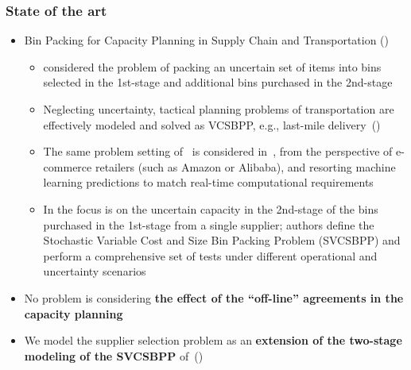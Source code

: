 \documentclass[,9pt,xcolor={dvipsnames}]{beamer} %
\begin{document}
\begin{frame}%
	\frametitle{State of the art}
	\begin{itemize}
		\item<1-> Bin Packing for Capacity Planning in Supply Chain and Transportation (\cite{chapterBernard2024}) 
		\begin{itemize}
        	\item<1-> \cite{crainic2016logistics} considered the problem of packing an uncertain set of items into bins selected in the 1st-stage and additional bins purchased in the 2nd-stage
	        \item<1-> Neglecting uncertainty, tactical planning problems of transportation are effectively modeled and solved as VCSBPP, e.g., last-mile delivery~(\cite{perboli2021new})
		    \item<1-> The same problem setting of~\cite{crainic2016logistics} is considered in~\cite{bruni2023machine}, from the perspective of e-commerce retailers (such as Amazon or Alibaba), and resorting machine learning predictions to match real-time computational requirements
	        \item<1-> In \cite{crainic2024} the focus is on the uncertain capacity in the 2nd-stage of the bins purchased in the 1st-stage from a single supplier; %
	        authors define the Stochastic Variable Cost and Size Bin Packing Problem (SVCSBPP) and perform a comprehensive set of tests under different operational and uncertainty scenarios
		\end{itemize}
    	\item<2-> No problem is considering \textbf{the effect of the ``off-line'' agreements in the capacity planning}
	    \item<3-> We model the supplier selection problem as an \textbf{extension of the two-stage modeling of the SVCSBPP} of~(\cite{crainic2024})
	\end{itemize}
\end{frame}
\end{document}
